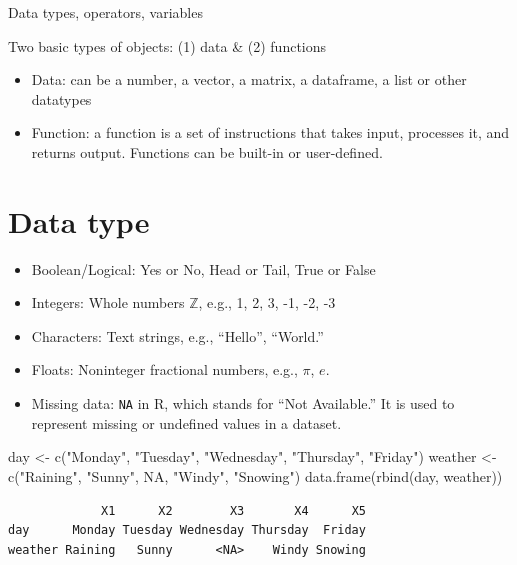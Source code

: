 \documentclass[
  letterpaper,
  DIV=11,
  numbers=noendperiod]{scrreprt}
\newenvironment{Shaded}{\begin{snugshade}}{\end{snugshade}}
\newcommand{\ConstantTok}[1]{\textcolor[rgb]{0.56,0.35,0.01}{#1}}
\newcommand{\FunctionTok}[1]{\textcolor[rgb]{0.28,0.35,0.67}{#1}}
\newcommand{\NormalTok}[1]{\textcolor[rgb]{0.00,0.23,0.31}{#1}}
\newcommand{\OtherTok}[1]{\textcolor[rgb]{0.00,0.23,0.31}{#1}}
\newcommand{\StringTok}[1]{\textcolor[rgb]{0.13,0.47,0.30}{#1}}
\begin{document}
Data types, operators, variables

Two basic types of objects: (1) data \& (2) functions

\begin{itemize}
\item
  Data: can be a number, a vector, a matrix, a dataframe, a list or
  other datatypes
\item
  Function: a function is a set of instructions that takes input,
  processes it, and returns output. Functions can be built-in or
  user-defined.
\end{itemize}

\section{Data type}\label{data-type}

\begin{itemize}
\item
  Boolean/Logical: Yes or No, Head or Tail, True or False
\item
  Integers: Whole numbers \(\mathbb{Z}\), e.g., 1, 2, 3, -1, -2, -3
\item
  Characters: Text strings, e.g., ``Hello'', ``World.''
\item
  Floats: Noninteger fractional numbers, e.g., \(\pi\), \(e\).
\item
  Missing data: \texttt{NA} in R, which stands for ``Not Available.'' It
  is used to represent missing or undefined values in a dataset.
\end{itemize}

\begin{Shaded}
\begin{Highlighting}[]
\NormalTok{day }\OtherTok{\textless{}{-}} \FunctionTok{c}\NormalTok{(}\StringTok{"Monday"}\NormalTok{, }\StringTok{"Tuesday"}\NormalTok{, }\StringTok{"Wednesday"}\NormalTok{, }\StringTok{"Thursday"}\NormalTok{, }\StringTok{"Friday"}\NormalTok{)}
\NormalTok{weather }\OtherTok{\textless{}{-}} \FunctionTok{c}\NormalTok{(}\StringTok{"Raining"}\NormalTok{, }\StringTok{"Sunny"}\NormalTok{, }\ConstantTok{NA}\NormalTok{, }\StringTok{"Windy"}\NormalTok{, }\StringTok{"Snowing"}\NormalTok{)}
\FunctionTok{data.frame}\NormalTok{(}\FunctionTok{rbind}\NormalTok{(day, weather))}
\end{Highlighting}
\end{Shaded}

\begin{verbatim}
             X1      X2        X3       X4      X5
day      Monday Tuesday Wednesday Thursday  Friday
weather Raining   Sunny      <NA>    Windy Snowing
\end{verbatim}
\end{document}
